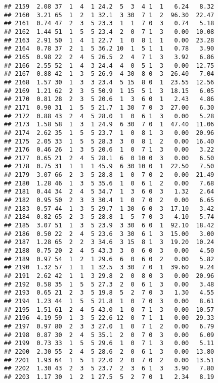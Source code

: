 \documentclass[
]{article}
\begin{document}
\begin{verbatim}
## 2159  2.08 37  1  4  1 24.2  5  3  4 1  1   6.24   8.32
## 2160  3.21 65  1  2  1 32.1  3 30  7 1  2  96.30  22.47
## 2161  0.74 47  2  3  5 23.3  1  1  7 0  3   0.74   5.18
## 2162  1.44 51  1  5  5 23.4  2  0  7 1  3   0.00  10.08
## 2163  2.91 50  1  4  1 22.7  1  0  8 1  1   0.00  23.28
## 2164  0.78 37  2  1  5 36.2 10  1  5 1  1   0.78   3.90
## 2165  0.98 22  2  4  5 26.5  2  4  7 1  3   3.92   6.86
## 2166  2.55 52  1  4  3 24.4  4  0  5 1  3   0.00  12.75
## 2167  0.88 42  1  3  5 26.9  4 30  8 0  3  26.40   7.04
## 2168  1.57 30  1  3  3 23.4  5 15  8 0  1  23.55  12.56
## 2169  1.21 62  2  3  5 50.9  1 15  5 1  3  18.15   6.05
## 2170  0.81 28  2  3  5 20.6  1  3  6 0  1   2.43   4.86
## 2171  0.90 31  1  5  5 21.7  1 30  7 0  3  27.00   6.30
## 2172  0.88 43  2  4  5 28.0  1  0  6 1  3   0.00   5.28
## 2173  1.58 58  1  3  1 24.9  6 30  7 0  1  47.40  11.06
## 2174  2.62 35  1  5  5 23.7  1  0  8 1  3   0.00  20.96
## 2175  2.05 33  1  5  5 28.3  3  0  8 1  2   0.00  16.40
## 2176  0.46 26  1  3  5 20.6  1  0  7 1  3   0.00   3.22
## 2177  0.65 21  2  4  5 28.1  6  0 10 0  3   0.00   6.50
## 2178  0.75 31  1  1  1 45.9  6 30 10 0  1  22.50   7.50
## 2179  3.07 66  2  3  5 28.8  1  0  7 0  2   0.00  21.49
## 2180  1.28 46  1  3  5 35.6  1  0  6 1  2   0.00   7.68
## 2181  0.44 34  2  4  5 34.7  1  3  6 0  3   1.32   2.64
## 2182  0.95 50  2  3  3 30.4  1  0  7 0  2   0.00   6.65
## 2183  0.57 44  1  3  5 29.7  1 30  6 0  3  17.10   3.42
## 2184  0.82 65  2  3  5 28.8  1  5  7 0  3   4.10   5.74
## 2185  3.07 51  1  3  5 23.9  3 30  6 0  1  92.10  18.42
## 2186  0.50 22  2  4  5 23.6  3 30  6 1  3  15.00   3.00
## 2187  1.28 65  2  2  3 34.6  3 15  8 1  3  19.20  10.24
## 2188  0.75 20  2  4  5 43.3  3  0  6 0  3   0.00   4.50
## 2189  0.97 54  1  2  1 29.6  6  0  6 0  2   0.00   5.82
## 2190  1.32 57  1  1  1 32.5  3 30  7 0  1  39.60   9.24
## 2191  2.62 42  1  1  3 29.8  2  0  8 0  3   0.00  20.96
## 2192  0.58 35  1  5  5 27.3  2  0  6 1  3   0.00   3.48
## 2193  0.65 21  2  3  5 19.8  5  2  7 0  3   1.30   4.55
## 2194  1.23 44  1  5  5 21.8  1  0  7 0  3   0.00   8.61
## 2195  1.51 61  2  4  5 43.0  1  0  7 1  3   0.00  10.57
## 2196  4.19 59  1  3  5 22.6 12  0  7 1  1   0.00  29.33
## 2197  0.97 80  2  3  3 27.0  1  0  7 1  2   0.00   6.79
## 2198  0.87 30  2  4  5 35.1  2  0  7 0  3   0.00   6.09
## 2199  0.73 33  1  5  5 29.6  1  0  7 1  3   0.00   5.11
## 2200  2.30 55  2  4  5 28.6  2  0  6 1  3   0.00  13.80
## 2201  1.93 64  1  5  1 22.0  2  0  7 0  2   0.00  13.51
## 2202  1.30 43  2  3  5 23.7  2  3  6 1  3   3.90   7.80
## 2203  1.17 30  1  2  1 27.5  5  2  7 0  1   2.34   8.19

\end{verbatim}
\end{document}

